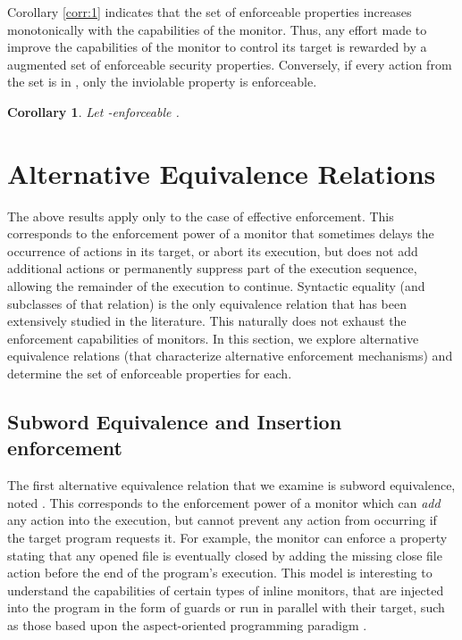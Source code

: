 \documentclass[12pt]{article}
\newtheorem{cor}{Corollary}
\begin{document}
Corollary \ref{corr:1} indicates that the set of enforceable properties increases monotonically with the capabilities of the monitor. Thus, any effort made to improve the capabilities of the monitor to control its target is rewarded by a augmented set of enforceable security properties. Conversely, if every action from the set  is in , only the inviolable property is enforceable.

\begin{cor}
\label{cor:2} Let -enforceable .
\end{cor}


\section{Alternative Equivalence Relations}\label{sec:equivalence}

The above results apply only to the case of effective enforcement. This corresponds to the enforcement power of a monitor that  sometimes delays the occurrence of actions in its target, or abort its execution, but does not add additional actions or permanently suppress part of the execution sequence, allowing the remainder of the execution to continue.  Syntactic equality (and subclasses of that relation) is the only equivalence relation that has been extensively studied in the literature. This naturally does not exhaust the enforcement capabilities of monitors.  In this section, we explore alternative equivalence relations (that characterize alternative enforcement mechanisms) and  determine the set of enforceable properties for each.

\subsection{Subword Equivalence and Insertion enforcement}
\label{sect:subword}
The first alternative equivalence relation that we examine is subword equivalence, noted . This corresponds to the enforcement power of a monitor which can \textit{add} any action into the execution, but cannot prevent any action from occurring if the target program requests it. For example, the monitor can enforce a property stating that any opened file is eventually closed by adding the missing close file action before the end of the program's execution.  This model is interesting to understand the capabilities of certain types of inline monitors, that are injected into the program in the form of guards or run in parallel with their target, such as those based upon the aspect-oriented programming paradigm \cite{aop,DBLP:journals/toplas/BoddenLH12,DBLP:conf/rv/MeredithR10}.
\end{document}
